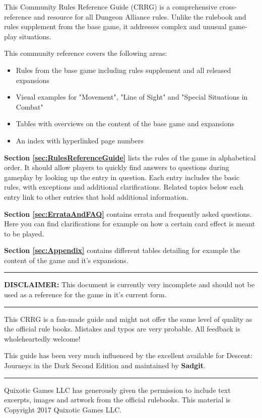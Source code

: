 This Community Rules Reference Guide (CRRG) is a comprehensive cross-reference and resource for all Dungeon Alliance rules. Unlike the rulebook and rules supplement from the base game, it addresses complex and unusual game-play situations.

This community reference covers the following areas:
\begin{itemize}
\item Rules from the base game including rules supplement and all released expansions
\item Visual examples for "Movement", "Line of Sight" and "Special
Situations in Combat"
\item Tables with overviews on the content of the base game and expansions
\item An index with hyperlinked page numbers
\end{itemize}

\textbf{Section \ref*{sec:RulesReferenceGuide}} lists the rules of the game in alphabetical order. It should allow players to quickly find answers to questions during gameplay by looking up the entry in question. Each entry includes the basic rules, with exceptions and additional clarifications. Related topics below each entry link to other entries that hold additional information.

\textbf{Section \ref*{sec:ErrataAndFAQ}} contains errata and frequently asked questions. Here you can find clarifications for example on how a certain card effect is meant to be played.

\textbf{Section \ref*{sec:Appendix}} contains different tables detailing for example the content of the game and it's expansions.

\noindent\hfil\rule{2cm}{.2pt}\hfil

\textbf{DISCLAIMER:} This document is currently very incomplete and should not be used as a reference for the game in it's current form.

\noindent\hfil\rule{2cm}{.2pt}\hfil

This CRRG is a fan-made guide and might not offer the same level of quality as the official rule books. Mistakes and typos are very probable. All feedback is wholeheartedly welcome!

This guide has been very much influenced by the excellent  available for Descent: Journeys in the Dark Second Edition and maintained by \textbf{Sadgit}.

\noindent\hfil\rule{2cm}{.2pt}\hfil

Quixotic Games LLC has generously given the permission to include text excerpts, images and artwork from the official rulebooks. This material is Copyright 2017 Quixotic Games LLC.